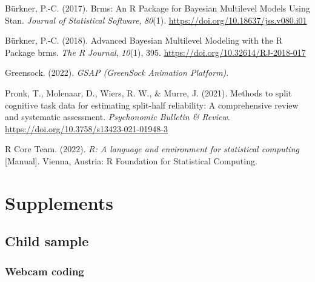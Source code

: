 \documentclass[
  man,floatsintext]{apa6}
\newlength{\cslhangindent}
\newlength{\cslentryspacingunit} %
\newenvironment{CSLReferences}[2] %
 {%
  \setlength{\parindent}{0pt}
  \ifodd #1
  \let\oldpar\par
  \def\par{\hangindent=\cslhangindent\oldpar}
  \fi
  \setlength{\parskip}{#2\cslentryspacingunit}
 }%
 {}
\begin{document}
\hypertarget{refs}{}
\begin{CSLReferences}{1}{0}
\leavevmode{}%
Bürkner, P.-C. (2017). Brms: {An R Package} for {Bayesian Multilevel Models Using Stan}. \emph{Journal of Statistical Software}, \emph{80}(1). \url{https://doi.org/10.18637/jss.v080.i01}

\leavevmode{}%
Bürkner, P.-C. (2018). Advanced {Bayesian Multilevel Modeling} with the {R Package} brms. \emph{The R Journal}, \emph{10}(1), 395. \url{https://doi.org/10.32614/RJ-2018-017}

\leavevmode{}%
Greensock. (2022). \emph{{GSAP} ({GreenSock Animation Platform})}.

\leavevmode{}%
Pronk, T., Molenaar, D., Wiers, R. W., \& Murre, J. (2021). Methods to split cognitive task data for estimating split-half reliability: {A} comprehensive review and systematic assessment. \emph{Psychonomic Bulletin \& Review}. \url{https://doi.org/10.3758/s13423-021-01948-3}

\leavevmode{}%
R Core Team. (2022). \emph{R: {A} language and environment for statistical computing} {[}Manual{]}. {Vienna, Austria}: {R Foundation for Statistical Computing}.

\end{CSLReferences}

\endgroup

\newpage

\hypertarget{supplements}{%
\section{Supplements}\label{supplements}}

\hypertarget{child-sample}{%
\subsection{Child sample}\label{child-sample}}

\hypertarget{webcam-coding}{%
\subsubsection{Webcam coding}\label{webcam-coding}}
\end{document}
